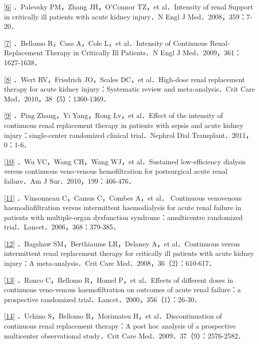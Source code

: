 \protect\hyperlink{text00018.htmlux5cux23ch6-17-back}{{[}6{]}}
．Palevsky PM，Zhang JH，O'Connor TZ，et al．Intensity of renal Support
in critically ill patients with acute kidney injury．N Engl J
Med．2008，359：7-20．

\protect\hyperlink{text00018.htmlux5cux23ch7-17-back}{{[}7{]}} ．Bellomo
R，Cass A，Cole L，et al．Intensity of Continuous Renal-Replacement
Therapy in Critically Ill Patients．N Engl J Med．2009，361：1627-1638．

\protect\hyperlink{text00018.htmlux5cux23ch8-17-back}{{[}8{]}} ．Wert
RV，Friedrich JO，Scales DC，et al．High-dose renal replacement therapy
for acute kidney injury：Systematic review and meta-analysis．Crit Care
Med．2010，38（5）：1360-1369．

\protect\hyperlink{text00018.htmlux5cux23ch9-17-back}{{[}9{]}} ．Ping
Zhang，Yi Yang，Rong Lv，et al．Effect of the intensity of continuous
renal replacement therapy in patients with sepsis and acute kidney
injury：single-center randomized clinical trial．Nephrol Dial
Transplant．2011，0：1-6．

\protect\hyperlink{text00018.htmlux5cux23ch10-17-back}{{[}10{]}} ．Wu
VC，Wang CH，Wang WJ，et al．Sustained low-efficiency dialysis versus
continuous veno-venous hemofiltration for postsurgical acute renal
failure．Am J Sur．2010，199：466-476．

\protect\hyperlink{text00018.htmlux5cux23ch11-17-back}{{[}11{]}}
．Vinsonneau C，Camus C，Combes A，et al． Continuous venovenous
haemodiafiltration versus intermittent haemodialysis for acute renal
failure in patients with multiple-organ dysfunction
syndrome：amulticentre randomized trial．Lancet．2006，368：379-385．

\protect\hyperlink{text00018.htmlux5cux23ch12-17-back}{{[}12{]}}
．Bagshaw SM，Berthiaume LR，Delaney A，et al．Continuous versus
intermittent renal replacement therapy for critically ill patients with
acute kidney injury：A meta-analysis．Crit Care
Med．2008，36（2）：610-617．

\protect\hyperlink{text00018.htmlux5cux23ch13-17-back}{{[}13{]}} ．Ronco
C，Bellomo R，Homel P，et al．Effects of different doses in continuous
veno-venous haemofiltration on outcomes of acute renal failure：a
prospective randomized trial．Lancet．2000，356（1）：26-30．

\protect\hyperlink{text00018.htmlux5cux23ch14-17-back}{{[}14{]}}
．Uchino S，Bellomo R，Morimatsu H，et al．Discontinuation of continuous
renal replacement therapy：A post hoc analysis of a prospective
multicenter observational study．Crit Care
Med．2009．37（9）：2576-2582．

